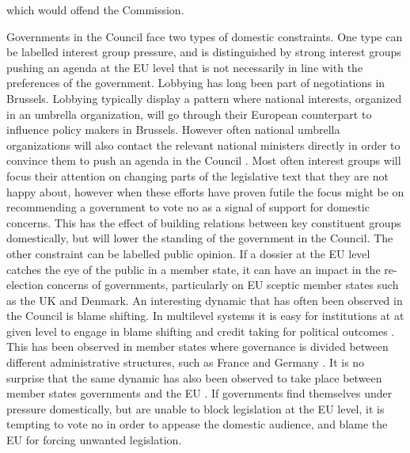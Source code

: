 which would offend the Commission. 

Governments in the Council face two types of domestic constraints. One type can be labelled interest group pressure, and is distinguished by strong interest groups pushing an agenda at the EU level that is not necessarily in line with the preferences of the government. Lobbying has long been part of negotiations in Brussels. Lobbying typically display a pattern where national interests, organized in an umbrella organization, will go through their European counterpart to influence policy makers in Brussels. However often national umbrella organizations will also contact the relevant national ministers directly in order to convince them to push an agenda in the Council \citep{Beyers2002}. Most often interest groups will focus their attention on changing parts of the legislative text that they are not happy about, however when these efforts have proven futile the focus might be on recommending a government to vote no as a signal of support for domestic concerns. This has the effect of building relations between key constituent groups domestically, but will lower the standing of the government in the Council. The other constraint can be labelled public opinion. If a dossier at the EU level catches the eye of the public in a member state, it can have an impact in the re-election concerns of governments, particularly on EU sceptic member states such as the UK and Denmark. An interesting dynamic that has often been observed in the Council is blame shifting. In multilevel systems it is easy for institutions at at given level to engage in blame shifting and credit taking for political outcomes \citep{Anderson2006}. This has been observed in member states where governance is divided between different administrative structures, such as France and Germany \citep{Elgie2006}. It is no surprise that the same dynamic has also been observed to take place between member states governments and the EU \citep{Franchino2004}. If governments find themselves under pressure domestically, but are unable to block legislation at the EU level, it is tempting to vote no in order to appease the domestic audience, and blame the EU for forcing unwanted legislation. 

